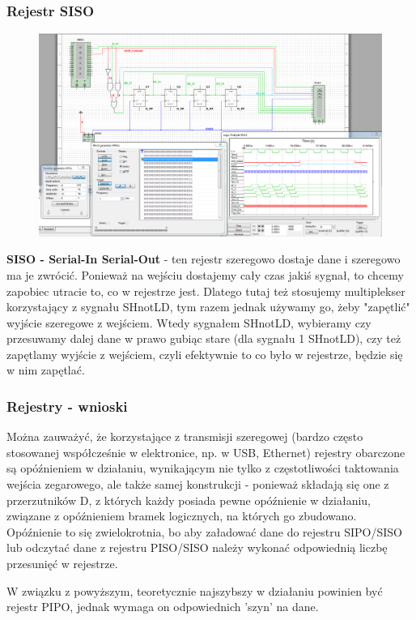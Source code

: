 \documentclass[12pt,a4paper]{article}
\begin{document}
\subsubsection{Rejestr SISO}
\begin{figure}[H]
\centering
\includegraphics[width=\textwidth]{img/3hSISO}
\end{figure}

\textbf{SISO - Serial-In Serial-Out} - ten rejestr szeregowo dostaje dane i szeregowo ma je zwrócić. Ponieważ na wejściu dostajemy cały czas jakiś sygnał, to chcemy zapobiec utracie to, co w rejestrze jest. Dlatego tutaj też stosujemy multiplekser korzystający z sygnału SHnotLD, tym razem jednak używamy go, żeby "zapętlić" wyjście szeregowe z wejściem. Wtedy sygnałem SHnotLD, wybieramy czy przesuwamy dalej dane w prawo gubiąc stare (dla sygnału 1 SHnotLD), czy też zapętlamy wyjście z wejściem, czyli efektywnie to co było w rejestrze, będzie się w nim zapętlać.

\subsubsection{Rejestry - wnioski}
Można zauważyć, że korzystające z transmisji szeregowej (bardzo często stosowanej współcześnie w elektronice, np. w USB, Ethernet) rejestry obarczone są opóźnieniem w działaniu, wynikającym nie tylko z częstotliwości taktowania wejścia zegarowego, ale także samej konstrukcji - ponieważ składają się one z przerzutników D, z których każdy posiada pewne opóźnienie w działaniu, związane z opóźnieniem bramek logicznych, na których go zbudowano. Opóźnienie to się zwielokrotnia, bo aby załadować dane do rejestru SIPO/SISO lub odczytać dane z rejestru PISO/SISO należy wykonać odpowiednią liczbę przesunięć w rejestrze.

W związku z powyższym, teoretycznie najszybszy w działaniu powinien być rejestr PIPO, jednak wymaga on odpowiednich 'szyn' na dane.
\end{document}
